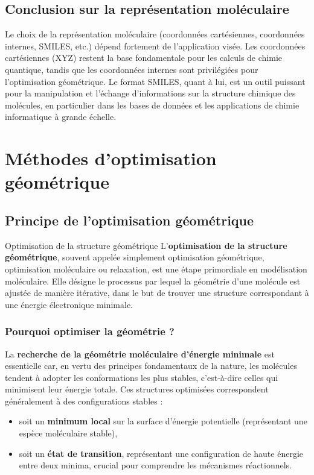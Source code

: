 \documentclass[12pt,a4paper]{article} %
\numberwithin{equation}{section} %
\numberwithin{figure}{section} %
\numberwithin{table}{section} %
\begin{document}
\subsection{Conclusion sur la représentation moléculaire}

Le choix de la représentation moléculaire (coordonnées cartésiennes, coordonnées internes, SMILES, etc.) dépend fortement de l'application visée. Les coordonnées cartésiennes (XYZ) restent la base fondamentale pour les calculs de chimie quantique, tandis que les coordonnées internes sont privilégiées pour l'optimisation géométrique. Le format SMILES, quant à lui, est un outil puissant pour la manipulation et l'échange d'informations sur la structure chimique des molécules, en particulier dans les bases de données et les applications de chimie informatique à grande échelle.

\section{Méthodes d'optimisation géométrique}

\subsection{Principe de l'optimisation géométrique}

\begin{definition}{Optimisation de la structure géométrique}{}
L'\textbf{optimisation de la structure géométrique}, souvent appelée simplement optimisation géométrique, optimisation moléculaire ou relaxation, est une étape primordiale en modélisation moléculaire. Elle désigne le processus par lequel la géométrie d'une molécule est ajustée de manière itérative, dans le but de trouver une structure correspondant à une énergie électronique minimale.
\end{definition}

\subsubsection{Pourquoi optimiser la géométrie ?}

La \textbf{recherche de la géométrie moléculaire d'énergie minimale} est essentielle car, en vertu des principes fondamentaux de la nature, les molécules tendent à adopter les conformations les plus stables, c'est-à-dire celles qui minimisent leur énergie totale. Ces structures optimisées correspondent généralement à des configurations stables : 
\begin{itemize}
\item soit un \textbf{minimum local} sur la surface d'énergie potentielle (représentant une espèce moléculaire stable), 
\item soit un \textbf{état de transition}, représentant une configuration de haute énergie entre deux minima, crucial pour comprendre les mécanismes réactionnels.
\end{itemize}
\end{document}
